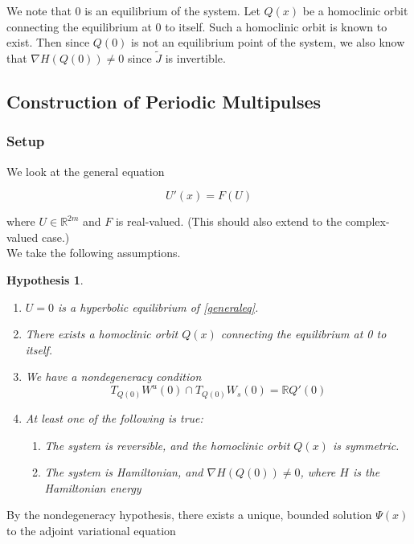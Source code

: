 \documentclass[12pt]{article}
\def\R{{\mathbb R}}
\newtheorem{hypothesis}{Hypothesis}
\begin{document}
We note that 0 is an equilibrium of the system. Let $Q(x)$ be a homoclinic orbit connecting the equilibrium at 0 to itself. Such a homoclinic orbit is known to exist. Then since $Q(0)$ is not an equilibrium point of the system, we also know that $\nabla H(Q(0)) \neq 0$ since $\tilde{J}$ is invertible.

\subsection{Construction of Periodic Multipulses}

\subsubsection{Setup}

We look at the general equation

\begin{equation}\label{generaleq}
U'(x) = F(U)
\end{equation}

where $U \in \R^{2m}$ and $F$ is real-valued. (This should also extend to the complex-valued case.)\\

We take the following assumptions.

\begin{hypothesis}\label{assumptions}
\[\]
\begin{enumerate}
	\item $U = 0$ is a hyperbolic equilibrium of \eqref{generaleq}.
	\item There exists a homoclinic orbit $Q(x)$ connecting the equilibrium at 0 to itself.
	\item We have a nondegeneracy condition
	\[
	T_{Q(0)} W^u(0) \cap T_{Q(0)} W_s(0) = \R Q'(0)
	\]
	\item At least one of the following is true:
	\begin{enumerate}
		\item The system is reversible, and the homoclinic orbit $Q(x)$ is symmetric.
		\item The system is Hamiltonian, and $\nabla H(Q(0)) \neq 0$, where $H$ is the Hamiltonian energy
	\end{enumerate}
\end{enumerate}
\end{hypothesis}

By the nondegeneracy hypothesis, there exists a unique, bounded solution $\Psi(x)$ to the adjoint variational equation
\end{document}
